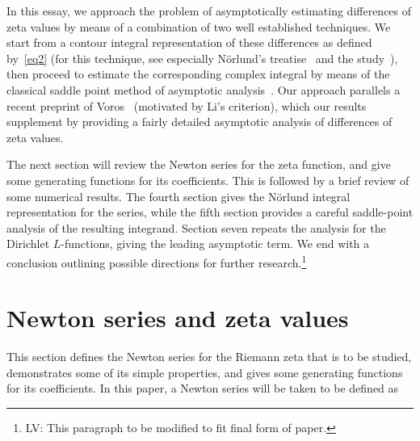 \documentclass{amsart}
\begin{document}
In this essay,  we  approach the problem of  asymptotically estimating
differences of  zeta  values by means of   a combination  of  two well
established   techniques.   We   start   from   a   contour   integral
representation of these  differences as defined by~\eqref{eq2}  (for this
technique, see   especially N\"orlund's treatise~\cite{Norlund54}  and
the study~\cite{FlSe95}),  then proceed to estimate the corresponding
complex  integral by  means of the classical  saddle point method of asymptotic
analysis~\cite{deBruijn81,Olver74}. Our approach parallels a recent  preprint
of Voros~\cite{Voros05} (motivated by Li's criterion), 
which our results supplement by providing a fairly 
detailed asymptotic analysis of differences of zeta values.

The next section will review the Newton series for the zeta function,
and give some generating functions for its coefficients. This is followed
by a brief review of some numerical results. The fourth section
gives the N\"orlund integral representation for the series,
while the fifth section provides a careful saddle-point analysis 
of the resulting integrand.  Section seven repeats the analysis
for the Dirichlet $L$-functions, giving the leading asymptotic
term.  We end with a conclusion outlining possible directions
for further research.\footnote{%
  LV: This paragraph to be modified to fit final form of paper.}



\section{Newton series and zeta values}


This section defines the Newton series for the Riemann zeta
that is to be studied, demonstrates some of its simple properties,
and gives some generating functions for its coefficients.
In this paper, a Newton series will be taken to be defined as
\end{document}
